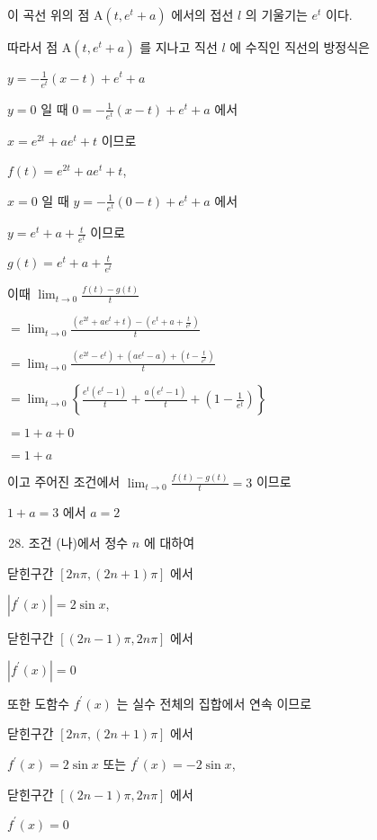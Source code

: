 \documentclass[10pt]{article}
\begin{document}
이 곡선 위의 점 $\mathrm{A}\left(t, e^{t}+a\right)$ 에서의 접선 $l$ 의 기울기는 $e^{t}$ 이다.

따라서 점 $\mathrm{A}\left(t, e^{t}+a\right)$ 를 지나고 직선 $l$ 에 수직인 직선의 방정식은

$y=-\frac{1}{e^{t}}(x-t)+e^{t}+a$

$y=0$ 일 때 $0=-\frac{1}{e^{t}}(x-t)+e^{t}+a$ 에서

$x=e^{2 t}+a e^{t}+t$ 이므로

$f(t)=e^{2 t}+a e^{t}+t$,

$x=0$ 일 때 $y=-\frac{1}{e^{t}}(0-t)+e^{t}+a$ 에서

$y=e^{t}+a+\frac{t}{e^{t}}$ 이므로

$g(t)=e^{t}+a+\frac{t}{e^{t}}$

이때 $\lim _{t \rightarrow 0} \frac{f(t)-g(t)}{t}$

$=\lim _{t \rightarrow 0} \frac{\left(e^{2 t}+a e^{t}+t\right)-\left(e^{t}+a+\frac{t}{e^{t}}\right)}{t}$

$=\lim _{t \rightarrow 0} \frac{\left(e^{2 t}-e^{t}\right)+\left(a e^{t}-a\right)+\left(t-\frac{t}{e^{t}}\right)}{t}$

$=\lim _{t \rightarrow 0}\left\{\frac{e^{t}\left(e^{t}-1\right)}{t}+\frac{a\left(e^{t}-1\right)}{t}+\left(1-\frac{1}{e^{t}}\right)\right\}$

$=1+a+0$

$=1+a$

이고 주어진 조건에서 $\lim _{t \rightarrow 0} \frac{f(t)-g(t)}{t}=3$ 이므로

$1+a=3$ 에서 $a=2$

\begin{enumerate}
  \setcounter{enumi}{27}
  \item 조건 (나)에서 정수 $n$ 에 대하여
\end{enumerate}

닫힌구간 $[2 n \pi,(2 n+1) \pi]$ 에서

$\left|f^{\prime}(x)\right|=2 \sin x$,

닫힌구간 $[(2 n-1) \pi, 2 n \pi]$ 에서

$\left|f^{\prime}(x)\right|=0$

또한 도함수 $f^{\prime}(x)$ 는 실수 전체의 집합에서 연속 이므로

닫힌구간 $[2 n \pi,(2 n+1) \pi]$ 에서

$f^{\prime}(x)=2 \sin x$ 또는 $f^{\prime}(x)=-2 \sin x$,

닫힌구간 $[(2 n-1) \pi, 2 n \pi]$ 에서

$f^{\prime}(x)=0$
\end{document}
